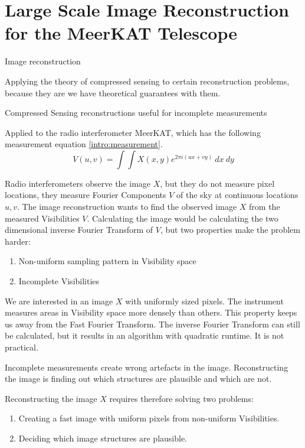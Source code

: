 \section{Large Scale Image Reconstruction for the MeerKAT Telescope} \label{intro}
Image reconstruction

Applying the theory of compressed sensing to certain reconstruction problems, because they are we have theoretical guarantees with them.

Compressed Sensing reconstructions useful for incomplete measurements

Applied to the radio interferometer MeerKAT, which has the following measurement equation \eqref{intro:measurement}.
\begin{equation}\label{intro:measurement}
V(u, v) = \int\int X(x, y) e^{2 \pi i (ux+vy)} \: dx \: dy 
\end{equation}

Radio interferometers observe the image $X$, but they do not measure pixel locations, they measure Fourier Components $V$ of the sky at continuous locations $u, v$. The image reconstruction wants to find the observed image $X$ from the measured Visibilities $V$. Calculating the image would be calculating the two dimensional inverse Fourier Transform of $V$, but two properties make the problem harder:

\begin{enumerate}
	\item Non-uniform sampling pattern in Visibility space
	\item Incomplete Visibilities
\end{enumerate}

We are interested in an image $X$ with uniformly sized pixels. The instrument measures areas in Visibility space more densely than others. This property keeps us away from the Fast Fourier Transform. The inverse Fourier Transform can still be calculated, but it results in an algorithm with quadratic runtime. It is not practical.

Incomplete measurements create wrong artefacts in the image. Reconstructing the image is finding out which structures are plausible and which are not.

Reconstructing the image $X$ requires therefore solving two problems:
\begin{enumerate}
	\item Creating a fast image with uniform pixels from non-uniform Visibilities.
	\item Deciding which image structures are plausible.
\end{enumerate}

